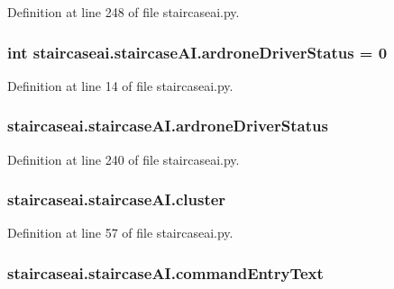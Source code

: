 Definition at line 248 of file staircaseai.\-py.

\hypertarget{classstaircaseai_1_1staircaseAI_a81113025f948e62b7d85719ddd1cc189}{
\subsubsection[{ardrone\-Driver\-Status}]{\setlength{\rightskip}{0pt plus 5cm}int staircaseai.\-staircase\-A\-I.\-ardrone\-Driver\-Status = 0\hspace{0.3cm}{\ttfamily [static]}}}\label{classstaircaseai_1_1staircaseAI_a81113025f948e62b7d85719ddd1cc189}


Definition at line 14 of file staircaseai.\-py.

\hypertarget{classstaircaseai_1_1staircaseAI_a2f76e2a18d929a8d80ed7d8090e3884a}{
\subsubsection[{ardrone\-Driver\-Status}]{\setlength{\rightskip}{0pt plus 5cm}staircaseai.\-staircase\-A\-I.\-ardrone\-Driver\-Status}}\label{classstaircaseai_1_1staircaseAI_a2f76e2a18d929a8d80ed7d8090e3884a}


Definition at line 240 of file staircaseai.\-py.

\hypertarget{classstaircaseai_1_1staircaseAI_ad4b23f2ca76299504bf0ed5492293b10}{
\subsubsection[{cluster}]{\setlength{\rightskip}{0pt plus 5cm}staircaseai.\-staircase\-A\-I.\-cluster}}\label{classstaircaseai_1_1staircaseAI_ad4b23f2ca76299504bf0ed5492293b10}


Definition at line 57 of file staircaseai.\-py.

\hypertarget{classstaircaseai_1_1staircaseAI_a2c20eaa6e814025adfe71f11737dd0cf}{
\subsubsection[{command\-Entry\-Text}]{\setlength{\rightskip}{0pt plus 5cm}staircaseai.\-staircase\-A\-I.\-command\-Entry\-Text}}\label{classstaircaseai_1_1staircaseAI_a2c20eaa6e814025adfe71f11737dd0cf}


